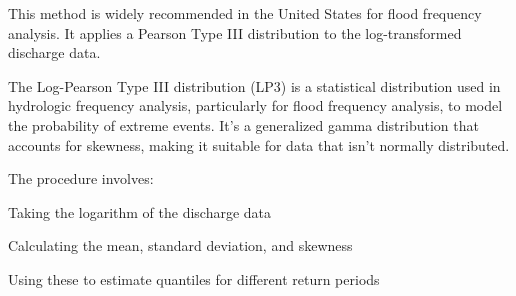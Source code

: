 \documentclass{tufte-handout}\usepackage[]{graphicx}\usepackage[]{xcolor}
\newenvironment{itemize*}%
  {\begin{itemize}%
    \setlength{\itemsep}{0pt}%
    \setlength{\parskip}{0pt}}%
  {\end{itemize}}
\begin{document}
This method is widely recommended in the United States for flood frequency analysis. It applies a Pearson Type III distribution to the log-transformed discharge data.

The Log-Pearson Type III distribution (LP3) is a statistical distribution used in hydrologic frequency analysis, particularly for flood frequency analysis, to model the probability of extreme events. It's a generalized gamma distribution that accounts for skewness, making it suitable for data that isn't normally distributed.

The procedure involves:

\begin{itemize*}
  \item Taking the logarithm of the discharge data
  \item Calculating the mean, standard deviation, and skewness
  \item Using these to estimate quantiles for different return periods
\end{itemize*}

\end{document}
